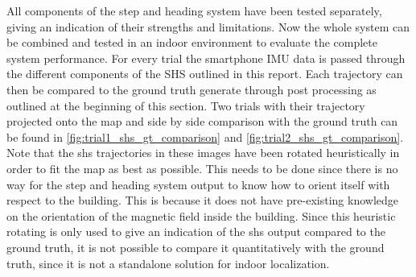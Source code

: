 All components of the step and heading system have been tested separately, giving an indication of their strengths and limitations. Now the whole system can be combined and tested in an indoor environment to evaluate the complete system performance.
For every trial the smartphone IMU data is passed through the different components of the SHS outlined in this report. Each trajectory can then be compared to the ground truth generate through post processing as outlined at the beginning of this section. Two trials with their trajectory projected onto the map and side by side comparison with the ground truth can be found in \cref{fig:trial1_shs_gt_comparison} and \cref{fig:trial2_shs_gt_comparison}. Note that the shs trajectories in these images have been rotated heuristically in order to fit the map as best as possible. This needs to be done since there is no way for the step and heading system output to know how to orient itself with respect to the building. This is because it does not have pre-existing knowledge on the orientation of the magnetic field inside the building. Since this heuristic rotating is only used to give an indication of the shs output compared to the ground truth, it is not possible to compare it quantitatively with the ground truth, since it is not a standalone solution for indoor localization.

